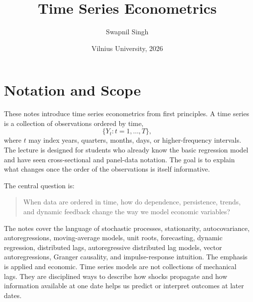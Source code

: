 

\title{Time Series Econometrics}
\author{Swapnil Singh}
\date{Vilnius University, 2026}

\DeclareMathOperator{\Cov}{Cov}
\DeclareMathOperator{\Var}{Var}
\DeclareMathOperator{\Corr}{Corr}
\DeclareMathOperator{\plim}{plim}
\DeclareMathOperator{\argmin}{arg\,min}
\newcommand{\R}{\mathbb{R}}
\newcommand{\1}{\mathbf{1}}
\newcommand{\dd}{\mathrm{d}}
\newcommand{\eps}{\varepsilon}
\newcommand{\calF}{\mathcal{F}}
\newcommand{\calI}{\mathcal{I}}
\newcommand{\calL}{\mathcal{L}}



\maketitle
\tableofcontents

\section*{Notation and Scope}
These notes introduce time series econometrics from first principles. A time series is a collection of observations ordered by time,
\[
\{Y_t:t=1,\ldots,T\},
\]
where $t$ may index years, quarters, months, days, or higher-frequency intervals. The lecture is designed for students who already know the basic regression model and have seen cross-sectional and panel-data notation. The goal is to explain what changes once the order of the observations is itself informative.

The central question is:
\begin{quote}
When data are ordered in time, how do dependence, persistence, trends, and dynamic feedback change the way we model economic variables?
\end{quote}

The notes cover the language of stochastic processes, stationarity, autocovariance, autoregressions, moving-average models, unit roots, forecasting, dynamic regression, distributed lags, autoregressive distributed lag models, vector autoregressions, Granger causality, and impulse-response intuition. The emphasis is applied and economic. Time series models are not collections of mechanical lags. They are disciplined ways to describe how shocks propagate and how information available at one date helps us predict or interpret outcomes at later dates.

